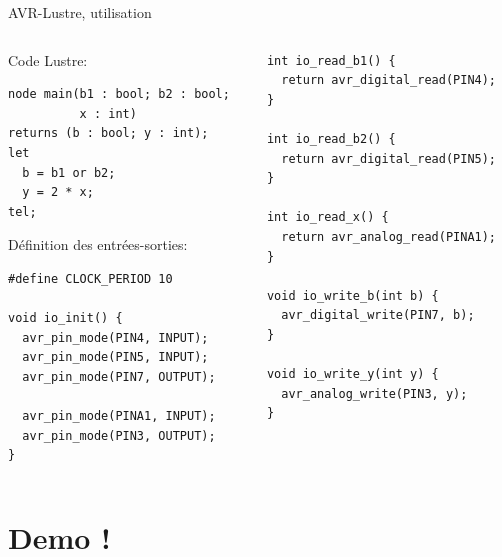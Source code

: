\documentclass[xcolor={svgnames},aspectratio=169]{beamer}
\begin{document}
\begin{frame}[fragile]{AVR-Lustre, utilisation}
\lstset{basicstyle=\tt\scriptsize}
  \begin{columns}[T]
    \begin{column}{.5\textwidth}
      Code Lustre:
      \begin{lstlisting}
node main(b1 : bool; b2 : bool;
          x : int)
returns (b : bool; y : int);
let
  b = b1 or b2;
  y = 2 * x;
tel;
      \end{lstlisting}
      Définition des entrées-sorties:
      \lstset{language=[ANSI]C,basicstyle=\tt\scriptsize}

      \begin{lstlisting}
#define CLOCK_PERIOD 10

void io_init() {
  avr_pin_mode(PIN4, INPUT);
  avr_pin_mode(PIN5, INPUT);
  avr_pin_mode(PIN7, OUTPUT);

  avr_pin_mode(PINA1, INPUT);
  avr_pin_mode(PIN3, OUTPUT);
}
      \end{lstlisting}
    \end{column}
    \begin{column}{.5\textwidth}
      \lstset{language=[ANSI]C,basicstyle=\tt\scriptsize}
      \begin{lstlisting}
int io_read_b1() {
  return avr_digital_read(PIN4);
}

int io_read_b2() {
  return avr_digital_read(PIN5);
}

int io_read_x() {
  return avr_analog_read(PINA1);
}

void io_write_b(int b) {
  avr_digital_write(PIN7, b);
}

void io_write_y(int y) {
  avr_analog_write(PIN3, y);
}
      \end{lstlisting}
    \end{column}
  \end{columns}
\end{frame}

\section{Demo !}

\begin{frame}
  \printbibliography
\end{frame}
\end{document}
